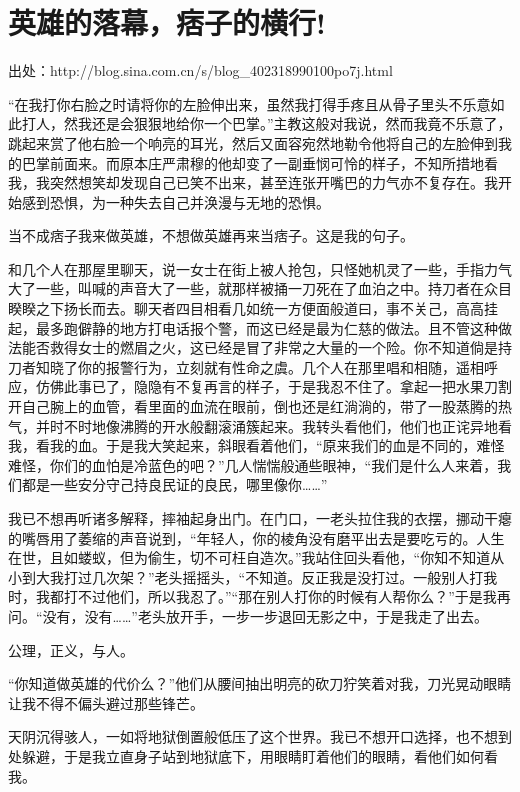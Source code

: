 \chapter{英雄的落幕，痞子的横行!}

\vspace{-25pt}

出处：http://blog.sina.com.cn/s/blog\_402318990100po7j.html

“在我打你右脸之时请将你的左脸伸出来，虽然我打得手疼且从骨子里头不乐意如此打人，然我还是会狠狠地给你一个巴掌。”主教这般对我说，然而我竟不乐意了，跳起来赏了他右脸一个响亮的耳光，然后又面容宛然地勒令他将自己的左脸伸到我的巴掌前面来。而原本庄严肃穆的他却变了一副垂悯可怜的样子，不知所措地看我，我突然想笑却发现自己已笑不出来，甚至连张开嘴巴的力气亦不复存在。我开始感到恐惧，为一种失去自己并涣漫与无地的恐惧。

当不成痞子我来做英雄，不想做英雄再来当痞子。这是我的句子\cite{hero_die}。

和几个人在那屋里聊天，说一女士在街上被人抢包，只怪她机灵了一些，手指力气大了一些，叫喊的声音大了一些，就那样被捅一刀死在了血泊之中。持刀者在众目睽睽之下扬长而去。聊天者四目相看几如统一方便面般道曰，事不关己，高高挂起，最多跑僻静的地方打电话报个警，而这已经是最为仁慈的做法。且不管这种做法能否救得女士的燃眉之火，这已经是冒了非常之大量的一个险。你不知道倘是持刀者知晓了你的报警行为，立刻就有性命之虞。几个人在那里唱和相随，遥相呼应，仿佛此事已了，隐隐有不复再言的样子，于是我忍不住了。拿起一把水果刀割开自己腕上的血管，看里面的血流在眼前，倒也还是红淌淌的，带了一股蒸腾的热气，并时不时地像沸腾的开水般翻滚涌簇起来。我转头看他们，他们也正诧异地看我，看我的血。于是我大笑起来，斜眼看着他们，“原来我们的血是不同的，难怪难怪，你们的血怕是冷蓝色的吧？”几人惴惴般通些眼神，“我们是什么人来着，我们都是一些安分守己持良民证的良民，哪里像你……”

我已不想再听诸多解释，摔袖起身出门。在门口，一老头拉住我的衣摆，挪动干瘪的嘴唇用了萎缩的声音说到，“年轻人，你的棱角没有磨平出去是要吃亏的。人生在世，且如蝼蚁，但为偷生，切不可枉自造次。”我站住回头看他，“你知不知道从小到大我打过几次架？”老头摇摇头，“不知道。反正我是没打过。一般别人打我时，我都打不过他们，所以我忍了。”“那在别人打你的时候有人帮你么？”于是我再问。“没有，没有……”老头放开手，一步一步退回无影之中，于是我走了出去。

公理，正义，与人。

“你知道做英雄的代价么？”他们从腰间抽出明亮的砍刀狞笑着对我，刀光晃动眼睛让我不得不偏头避过那些锋芒。

天阴沉得骇人，一如将地狱倒置般低压了这个世界。我已不想开口选择，也不想到处躲避，于是我立直身子站到地狱底下，用眼睛盯着他们的眼睛，看他们如何看我。

